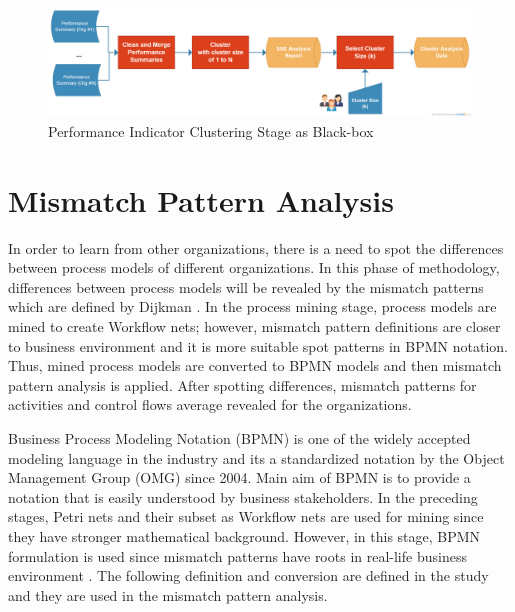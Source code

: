\begin{figure}
  \centering
  \includegraphics[width=\textwidth]{4_methodology/performance-indicator-clustering-blackbox}
  \caption{Performance Indicator Clustering Stage as Black-box }
  \label{fig:performance-indicator-clustering-blackbox}
\end{figure}
 
\section{Mismatch Pattern Analysis}
\label{sec:mismatch-pattern-analysis}
In order to learn from other organizations, there is a need to spot the differences between process models of different organizations. In this phase of methodology, differences between process models will be revealed by the mismatch patterns which are defined by Dijkman \cite{dijkman2007mismatch}. In the process mining stage, process models are mined to create Workflow nets; however, mismatch pattern definitions are closer to business environment and it is more suitable spot patterns in BPMN notation. Thus, mined process models are converted to BPMN models and then mismatch pattern analysis is applied. After spotting differences, mismatch patterns for activities and control flows average revealed for the organizations.

Business Process Modeling Notation (BPMN) is one of the widely accepted modeling language in the industry and its a standardized notation by the Object Management Group (OMG) since 2004. Main aim of BPMN is to provide a notation that is easily understood by business stakeholders. In the preceding stages, Petri nets and their subset as Workflow nets are used for mining since they have stronger mathematical background. However, in this stage, BPMN formulation is used since mismatch patterns have roots in real-life business environment \cite{dijkman2007mismatch}. The following definition and conversion are defined in the study \cite{kalenkovaprocess} and they are used in the mismatch pattern analysis. 

